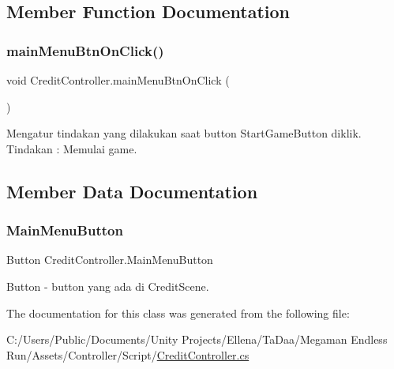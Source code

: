 \subsection{Member Function Documentation}
\hypertarget{class_credit_controller_ad486d59710cfdbb207f0c4835143f86d}{}\label{class_credit_controller_ad486d59710cfdbb207f0c4835143f86d} 
\subsubsection{\texorpdfstring{main\+Menu\+Btn\+On\+Click()}{mainMenuBtnOnClick()}}
{\footnotesize\ttfamily void Credit\+Controller.\+main\+Menu\+Btn\+On\+Click (\begin{DoxyParamCaption}{ }\end{DoxyParamCaption})}



Mengatur tindakan yang dilakukan saat button Start\+Game\+Button diklik. Tindakan \+: Memulai game. 



\subsection{Member Data Documentation}
\hypertarget{class_credit_controller_a8b122365e9edd7291df09824506f726d}{}\label{class_credit_controller_a8b122365e9edd7291df09824506f726d} 
\subsubsection{\texorpdfstring{Main\+Menu\+Button}{MainMenuButton}}
{\footnotesize\ttfamily Button Credit\+Controller.\+Main\+Menu\+Button}



Button -\/ button yang ada di Credit\+Scene. 



The documentation for this class was generated from the following file\+:\begin{DoxyCompactItemize}
\item 
C\+:/\+Users/\+Public/\+Documents/\+Unity Projects/\+Ellena/\+Ta\+Daa/\+Megaman Endless Run/\+Assets/\+Controller/\+Script/\hyperlink{_credit_controller_8cs}{Credit\+Controller.\+cs}\end{DoxyCompactItemize}
